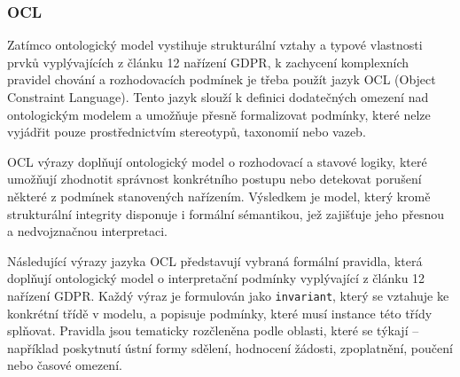 
\subsubsection{OCL}
\label{sec:ocl}

Zatímco ontologický model vystihuje strukturální vztahy a typové vlastnosti prvků vyplývajících z článku 12 nařízení GDPR, k zachycení komplexních pravidel chování a rozhodovacích podmínek je třeba použít jazyk OCL (Object Constraint Language). Tento jazyk slouží k definici dodatečných omezení nad ontologickým modelem a umožňuje přesně formalizovat podmínky, které nelze vyjádřit pouze prostřednictvím stereotypů, taxonomií nebo vazeb.

OCL výrazy doplňují ontologický model o rozhodovací a stavové logiky, které umožňují zhodnotit správnost konkrétního postupu nebo detekovat porušení některé z podmínek stanovených nařízením. Výsledkem je model, který kromě strukturální integrity disponuje i formální sémantikou, jež zajišťuje jeho přesnou a nedvojznačnou interpretaci.

Následující výrazy jazyka OCL představují vybraná formální pravidla, která doplňují ontologický model o interpretační podmínky vyplývající z článku 12 nařízení GDPR. Každý výraz je formulován jako \texttt{invariant}, který se vztahuje ke konkrétní třídě v modelu, a popisuje podmínky, které musí instance této třídy splňovat. Pravidla jsou tematicky rozčleněna podle oblasti, které se týkají – například poskytnutí ústní formy sdělení, hodnocení žádosti, zpoplatnění, poučení nebo časové omezení.

